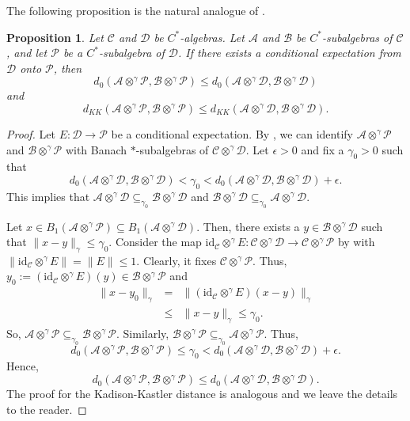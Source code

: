 \documentclass{amsart}
\numberwithin{equation}{section}
\newcommand{\1}{\mathbf{1}}
\newcommand{\mA}{\mathcal{A}}
\newcommand{\mB}{\mathcal{B}}
\newcommand{\mC}{\mathcal{C}}
\newcommand{\mD}{\mathcal{D}}
\newcommand{\mP}{\mathcal{P}}
\newtheorem{proposition}[theorem]{Proposition}
\begin{document}
The following proposition is the natural analogue of \cite[Proposition
  4.1]{GK2}.
\begin{proposition}
Let $\mC$ and $\mD$ be $C^*$-algebras. Let $\mA$ and $\mB$ be
$C^*$-subalgebras of $\mC$, and let $\mP$ be a $C^*$-subalgebra of
$\mD$. If there exists a conditional expectation from $\mD$ onto
$\mP$, then
\[
d_{0}(\mA \otimes^{\gamma} \mP, \mB\otimes^{\gamma} \mP)\leq d_{0}(\mA
\otimes^{\gamma} \mD, \mB\otimes^{\gamma} \mD)
\]
and 
\[
d_{KK}(\mA \otimes^{\gamma} \mP, \mB\otimes^{\gamma} \mP)\leq
d_{KK}(\mA \otimes^{\gamma} \mD, \mB\otimes^{\gamma} \mD).
\]
\end{proposition}
\begin{proof}
Let $E: \mD \to \mP$ be a conditional expectation. By
, we can identify $\mA \otimes^{\gamma} \mP$ and
$\mB \otimes^{\gamma} \mP$ with Banach $*$-subalgebras of $\mC
\otimes^{\gamma} \mD$.  Let $\epsilon>0$ and fix a $\gamma_{0}>0$ such
that
\[
d_{0}(\mA \otimes^{\gamma} \mD, \mB\otimes^{\gamma} \mD)< \gamma_{0} <
d_{0}(\mA \otimes^{\gamma} \mD, \mB\otimes^{\gamma} \mD) + \epsilon.
\]
This implies that $\mA \otimes^{\gamma}
\mD\subseteq_{\gamma_{0}}\mB\otimes^{\gamma} \mD$ and $\mB
\otimes^{\gamma} \mD\subseteq_{\gamma_{0}}\mA\otimes^{\gamma} \mD$.

Let $x\in B_{1}(\mA \otimes^{\gamma} \mP)\subseteq B_{1}(\mA
\otimes^{\gamma} \mD)$. Then, there exists a $y\in \mB
\otimes^{\gamma} \mD$ such that $\|x-y\|_{\gamma}\leq
\gamma_{0}$. Consider the map $\mathrm{id}_{\mC}\otimes^{\gamma} E:
\mC \otimes^{\gamma} \mD \to \mC \otimes^{\gamma} \mP$ by  with $\|\mathrm{id}_{\mC}\otimes^{\gamma} E\|=
\|E\|\leq 1$. Clearly, it fixes $\mC\otimes^{\gamma} \mP$. Thus,
$y_{0}:= (\mathrm{id}_{\mC}\otimes^{\gamma} E)(y)\in \mB
\otimes^{\gamma} \mP$ and
\begin{eqnarray*}
\|x-y_{0}\|_{\gamma} &=& \|(\mathrm{id}_{\mC}\otimes^{\gamma} E)(x-y)\|_{\gamma}\\
&\leq & \|x-y\|_{\gamma}\leq \gamma_{0}.
\end{eqnarray*}
So, $\mA \otimes^{\gamma} \mP\subseteq_{\gamma_{0}}\mB \otimes^{\gamma}
\mP$. Similarly,  $\mB \otimes^{\gamma} \mP\subseteq_{\gamma_{0}}\mA \otimes^{\gamma}
\mP$. Thus, 
\[
d_{0}(\mA \otimes^{\gamma}\mP, \mB \otimes^{\gamma} \mP)\leq \gamma_{0}< d_{0}(\mA \otimes^{\gamma}
\mD, \mB \otimes^{\gamma} \mD)+ \epsilon.
\]
Hence,
\[
d_{0}(\mA \otimes^{\gamma} \mP, \mB \otimes^{\gamma} \mP) \leq
d_{0}(\mA \otimes^{\gamma} \mD, \mB \otimes^{\gamma} \mD).
\] 
The proof for the Kadison-Kastler distance is analogous and we leave
the details to the reader.
\end{proof}
\end{document}
